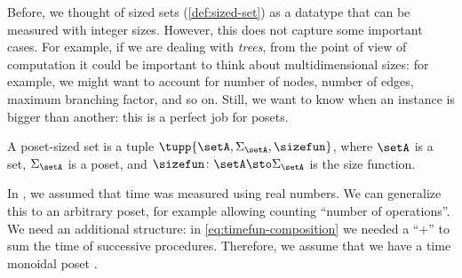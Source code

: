 Before, we thought of sized sets (\cref{def:sized-set}) as a datatype that can be measured with integer sizes. However, this does not capture some important cases. For example, if we are dealing with \emph{trees}, from the point of view of computation it could be important to think about multidimensional sizes: for example, we might want to account for number of nodes, number of edges, maximum branching factor, and so on. Still, we want to know when an instance is bigger than another: this is a perfect job for posets.

\begin{definition}\label{def:poset-sized-set}
    A poset-sized set is a tuple $\tupp{\setA, \Sigma_{\setA}, \sizefun}$, where $\setA$ is a set, $\Sigma_\setA$ is a poset, and  $\sizefun \colon \setA \sto \Sigma_\setA$ is the size function.
\end{definition}

\newcommand{\TimeMonoidal}{\Cat{T}}
\newcommand{\SpaceMonoidal}{\Cat{S}}
\newcommand{\SpaceTime}{\SpaceMonoidal\TimeMonoidal}
\newcommand{\ProcMod}{\Cat{ProcSizeTime}_{\TimeMonoidal}}
\newcommand{\ProcSTMod}{\Cat{ProcSizeTime}_{\SpaceTime}}
\newcommand{\spacefun}{\operatorname{space}}


In \ProcSizeTime, we assumed that time was measured using real numbers. We can generalize this to an arbitrary poset, for example allowing counting ``number of operations''.
We need an additional structure: in \vref{eq:timefun-composition} we needed a ``+'' to sum the time of successive procedures. Therefore, we assume that we have a time monoidal poset \TimeMonoidal.


